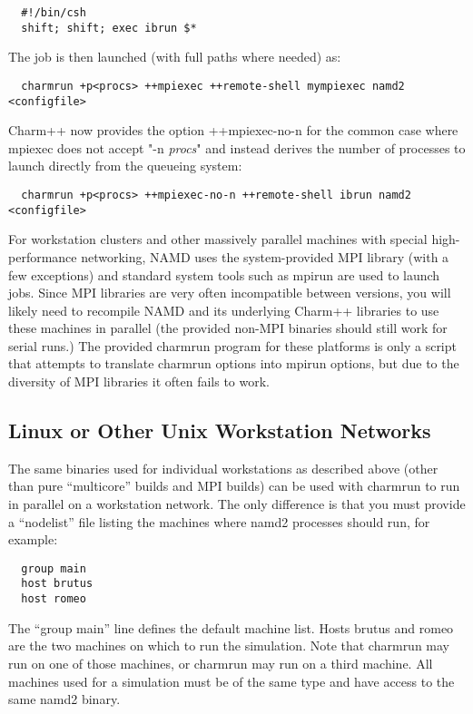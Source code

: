 \begin{verbatim}
  #!/bin/csh
  shift; shift; exec ibrun $*
\end{verbatim}

The job is then launched (with full paths where needed) as:

\begin{verbatim}
  charmrun +p<procs> ++mpiexec ++remote-shell mympiexec namd2 <configfile>
\end{verbatim}

Charm++ now provides the option ++mpiexec-no-n for the common case
where mpiexec does not accept "-n {\em procs}" and instead derives the
number of processes to launch directly from the queueing system:

\begin{verbatim}
  charmrun +p<procs> ++mpiexec-no-n ++remote-shell ibrun namd2 <configfile>
\end{verbatim}

For workstation clusters and other massively parallel machines with
special high-performance networking, NAMD uses the system-provided MPI
library (with a few exceptions) and standard system tools such as mpirun
are used to launch jobs.  Since MPI libraries are very often incompatible
between versions, you will likely need to recompile NAMD and its
underlying Charm++ libraries to use these machines in parallel (the
provided non-MPI binaries should still work for serial runs.) The provided
charmrun program for these platforms is only a script that attempts to
translate charmrun options into mpirun options, but due to the diversity
of MPI libraries it often fails to work.

\subsection{Linux or Other Unix Workstation Networks}

The same binaries used for individual workstations as described above
(other than pure ``multicore'' builds and MPI builds)
can be used with charmrun to run in parallel on a workstation network.
The only difference is that you must provide a ``nodelist'' file listing
the machines where namd2 processes should run, for example:

\begin{verbatim}
  group main
  host brutus
  host romeo
\end{verbatim}

The ``group main'' line defines the default machine list.  Hosts brutus
and romeo are the two machines on which to run the simulation.  Note
that charmrun may run on one of those machines, or charmrun may run
on a third machine.  All machines used for a simulation must be of the
same type and have access to the same namd2 binary.

